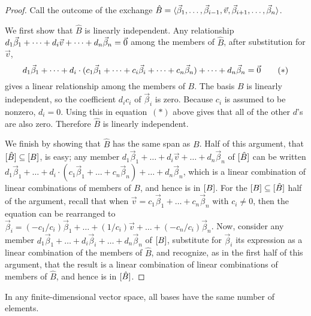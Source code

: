 \begin{proof}
Call the outcome of the exchange 
\( \hat{B}=\langle\vec{\beta}_1,\dots,\vec{\beta}_{i-1},\vec{v},
                       \vec{\beta}_{i+1},\dots,\vec{\beta}_n\rangle  \).

We first show that $\hat{B}$ is linearly independent.
Any relationship 
\( d_1\vec{\beta}_1+\dots+d_i\vec{v}+\dots+d_n\vec{\beta}_n=\vec{0} \)
among the members of $\hat{B}$, after substitution for $\vec{v}$,
\begin{equation*}
  d_1\vec{\beta}_1+\dots
    +d_i\cdot(c_1\vec{\beta}_1+\dots+c_i\vec{\beta}_i+\dots+c_n\vec{\beta}_n)
    +\dots+d_n\vec{\beta}_n
  =\vec{0}
\tag*{($*$)}\end{equation*}
gives a linear relationship among the members of $B$.
The basis $B$ is linearly independent, so the coefficient $d_ic_i$ of 
$\vec{\beta}_i$ is zero.
Because $c_i$ is assumed to be nonzero, $d_i=0$.
Using this in equation~$(*)$ above gives that all of the other $d$'s are also
zero.
Therefore $\hat{B}$ is linearly independent.

We finish by showing that $\hat{B}$ has the same span as $B$.
Half of this argument, that $\relax [\smash{\hat{B}}\relax ]\subseteq\relax [B\relax ]$, 
is easy; any member 
$d_1\vec{\beta}_1+\dots+d_i\vec{v}+\dots+d_n\vec{\beta}_n$
of $\relax [\smash{\hat{B}}\relax ]$ can be written
$
  d_1\vec{\beta}_1+\dots
    +d_i\cdot(c_1\vec{\beta}_1+\dots+c_n\vec{\beta}_n)
    +\dots+d_n\vec{\beta}_n
$,
which is a linear combination of linear combinations of members of $B$, and
hence is in $\relax [B\relax ]$.
For the $\relax [B\relax ]\subseteq\relax [\smash{\hat{B}}\relax ]$ half of the argument,
recall that when
$\vec{v}=c_1\vec{\beta}_1+\dots+c_n\vec{\beta}_n$ with $c_i\neq 0$,
then the equation can be rearranged to
$\vec{\beta}_i=(-c_1/c_i)\vec{\beta}_1+\dots+(1/c_i)\vec{v}+\dots
   +(-c_n/c_i)\vec{\beta}_n$.
Now, consider any member
$d_1\vec{\beta}_1+\dots+d_i\vec{\beta}_i+\dots+d_n\vec{\beta}_n$
of $\relax [B\relax ]$, substitute for $\vec{\beta}_i$ its expression as a linear
combination of the members of $\hat{B}$, and recognize, 
as in the first half of this argument, that the result is a linear
combination of linear combinations of members of $\hat{B}$, and hence is in 
$\relax [\smash{\hat{B}}\relax ]$.
\end{proof}

\begin{theorem}
\label{th:AllBasesSameSize}
In any finite-dimensional vector space, all 
bases have the same number of elements.
\end{theorem}

